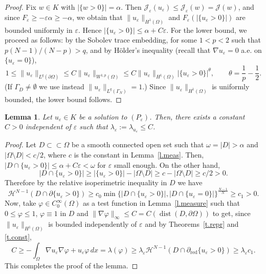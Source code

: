 \documentclass[11pt]{amsart}
\newtheorem{lemma}{Lemma}[section]
\theoremstyle{definition}
\theoremstyle{remark}
\numberwithin{equation}{section}
\newcommand{\cH}{\mathcal{H}}
\newcommand{\cJ}{\mathcal{J}}
\DeclareMathOperator{\dist}{dist}
\newcommand{\red}{\mathrm{red}}
\begin{document}
\begin{proof}
Fix $w\in K$ with $|\{w>0\}|=\alpha$. Then $\cJ_\varepsilon(u_\varepsilon)\le\cJ_\varepsilon(w)=\cJ(w)$, and since $F_\varepsilon\ge-\varepsilon\alpha\ge-\alpha$, we obtain that $\|u_\varepsilon\|_{H^1(\Omega)}$ and $F_\varepsilon(|\{u_\varepsilon>0\}|)$ are bounded uniformly in $\varepsilon$. Hence $|\{u_\varepsilon>0\}|\le\alpha+C\varepsilon$. For the lower bound, we proceed as follows: by the Sobolev trace embedding, for some $1<p<2$ such that $p(N-1)/(N-p)>q$, and by Hölder's inequality (recall that $\nabla u_\varepsilon=0$ a.e. on $\{u_\varepsilon=0\}$),
\[
1\le\|u_\varepsilon\|_{L^q(\partial\Omega)}\le C\|u_\varepsilon\|_{W^{1,p}(\Omega)}\le C\|u_\varepsilon\|_{H^1(\Omega)}|\{u_\varepsilon>0\}|^\theta,\qquad\theta=\frac1p-\frac12.
\]
(If $\Gamma_D\neq\emptyset$ we use instead $\|u_\varepsilon\|_{L^q(\Gamma_N)}=1$.) Since $\|u_\varepsilon\|_{H^1(\Omega)}$ is uniformly bounded, the lower bound follows.
\end{proof}

\begin{lemma}\label{l.upper}
Let $u_\varepsilon\in K$ be a solution to $(P_\varepsilon)$. Then, there exists a constant $C>0$ independent of $\varepsilon$ such that $\lambda_\varepsilon:=\lambda_{u_\varepsilon}\le C$.
\end{lemma}

\begin{proof}
Let $D\subset\subset\Omega$ be a smooth connected open set such that $\omega=|D|>\alpha$ and $|\Omega\setminus D|<c/2$, where $c$ is the constant in Lemma~\ref{l.meas}. Then, $|D\cap\{u_\varepsilon>0\}|\le\alpha+C\varepsilon<\omega$ for $\varepsilon$ small enough. On the other hand,
\[
|D\cap\{u_\varepsilon>0\}|\ge|\{u_\varepsilon>0\}|-|\Omega\setminus D|\ge c-|\Omega\setminus D|\ge c/2>0.
\]
Therefore by the relative isoperimetric inequality in $D$ we have
\[
\cH^{N-1}(D\cap\partial\{u_\varepsilon>0\})\ge c_0\min\{|D\cap\{u_\varepsilon>0\}|,|D\cap\{u_\varepsilon=0\}|\}^{\frac{N-1}N}\ge c_1>0.
\]
Now, take $\varphi\in C^\infty_0(\Omega)$ as a test function in Lemma~\ref{l.measure} such that $0\le\varphi\le1$, $\varphi\equiv1$ in $D$ and $\|\nabla\varphi\|_\infty\le C=C(\dist(D,\partial\Omega))$ to get, since $\|u_\varepsilon\|_{H^1(\Omega)}$ is bounded independently of $\varepsilon$ and by Theorems~\ref{t.repr} and \ref{t.const},
\[
C\ge-\int_\Omega\nabla u_\varepsilon\nabla\varphi+u_\varepsilon\varphi\,dx=\lambda(\varphi)\ge\lambda_\varepsilon\cH^{N-1}(D\cap\partial_\red\{u_\varepsilon>0\})\ge\lambda_\varepsilon c_1.
\]
This completes the proof of the lemma.
\end{proof}
\end{document}
